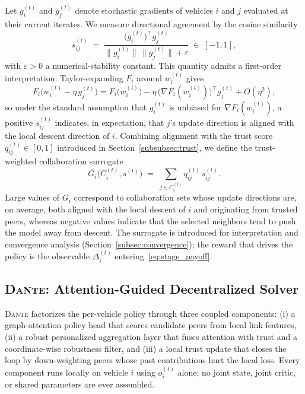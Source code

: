 Let $g_i^{(t)}$ and $g_j^{(t)}$ denote stochastic gradients of vehicles $i$ and $j$ evaluated at their current iterates. We measure directional agreement by the cosine similarity
\begin{equation*}
    s_{ij}^{(t)} \;=\; \frac{\bigl(g_i^{(t)}\bigr)^\top g_j^{(t)}}{\|g_i^{(t)}\|\,\|g_j^{(t)}\|+\varepsilon}\;\in\;[-1,1],
\end{equation*}
with $\varepsilon>0$ a numerical-stability constant. This quantity admits a first-order interpretation: Taylor-expanding $F_i$ around $w_i^{(t)}$ gives
\begin{equation*}
    F_i\!\bigl(w_i^{(t)}-\eta\, g_j^{(t)}\bigr) = F_i\!\bigl(w_i^{(t)}\bigr) - \eta\,\bigl(\nabla F_i(w_i^{(t)})\bigr)^{\!\top} g_j^{(t)} + O(\eta^2),
\end{equation*}
so under the standard assumption that $g_i^{(t)}$ is unbiased for $\nabla F_i(w_i^{(t)})$, a positive $s_{ij}^{(t)}$ indicates, in expectation, that $j$'s update direction is aligned with the local descent direction of $i$. Combining alignment with the trust score $q_{ij}^{(t)}\in[0,1]$ introduced in Section~\ref{subsubsec:trust}, we define the trust-weighted collaboration surrogate
\begin{equation}
\label{eq:G_surrogate}
    G_i\!\bigl(C_i^{(t)},s^{(t)}\bigr) \;=\; \sum_{j\in C_i^{(t)}} q_{ij}^{(t)}\,s_{ij}^{(t)}.
\end{equation}
Large values of $G_i$ correspond to collaboration sets whose update directions are, on average, both aligned with the local descent of $i$ and originating from trusted peers, whereas negative values indicate that the selected neighbors tend to push the model away from descent. The surrogate is introduced for interpretation and convergence analysis (Section~\ref{subsec:convergence}); the reward that drives the policy is the observable $\Delta_i^{(t)}$ entering~\eqref{eq:stage_payoff}.

\subsection{\textsc{Dante}: Attention-Guided Decentralized Solver}
\label{subsec:dante}

\textsc{Dante} factorizes the per-vehicle policy through three coupled components: (i) a graph-attention policy head that scores candidate peers from local link features, (ii) a robust personalized aggregation layer that fuses attention with trust and a coordinate-wise robustness filter, and (iii) a local trust update that closes the loop by down-weighting peers whose past contributions hurt the local loss. Every component runs locally on vehicle $i$ using $o_i^{(t)}$ alone; no joint state, joint critic, or shared parameters are ever assembled.

